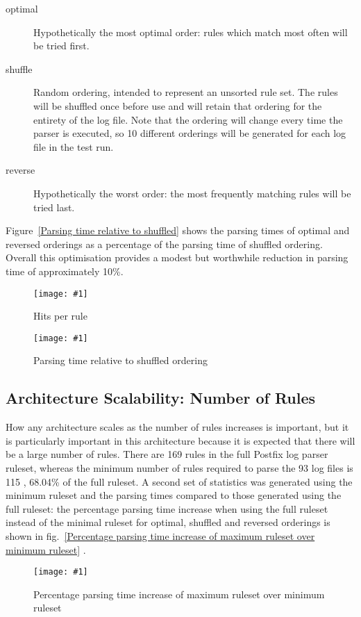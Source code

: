 \documentclass[draft]{svmult}
\newcommand{\showgraph}[3]{%
    \begin{figure}[hbtp]%
        \caption{#2}\label{#3}%
        \texttt{[image: \#1]}%
    \end{figure}%
}
\newcommand{\refwithlabel}[2]{%
    #1~\vref{#2}%
}
\newcommand{\graphref}[1]{%
    \refwithlabel{fig.}{#1}%
}
\newcommand{\Graphref}[1]{%
    \refwithlabel{Figure}{#1}%
}
\newcommand{\numberOFlogFILES}[0]{%
    93%
}
\newcommand{\numberOFrules}[0]{%
    169%
}
\newcommand{\numberOFrulesMINIMUM}[0]{%
    115%
}
\newcommand{\numberOFrulesMINIMUMpercentage}[0]{%
    68.04\%%
}
\begin{document}
\begin{description}

    \item [optimal]  Hypothetically the most optimal order: rules which
        match most often will be tried first.

    \item [shuffle] Random ordering, intended to represent an unsorted rule
        set.  The rules will be shuffled once before use and will retain
        that ordering for the entirety of the log file.  Note that the
        ordering will change every time the parser is executed, so 10
        different orderings will be generated for each log file in the test
        run.

    \item [reverse] Hypothetically the worst order: the most frequently
        matching rules will be tried last.

\end{description}

\Graphref{Parsing time relative to shuffled} shows the parsing times of
optimal and reversed orderings as a percentage of the parsing time of
shuffled ordering.  Overall this optimisation provides a modest but
worthwhile reduction in parsing time of approximately 10\%.
\showgraph{build/graph-hits}{Hits per rule}{rule hits graph}
\showgraph{build/graph-optimal-and-reverse-vs-shuffle}{Parsing time
relative to shuffled ordering}{Parsing time relative to shuffled}

\subsection{Architecture Scalability: Number of Rules}

How any architecture scales as the number of rules increases is important,
but it is particularly important in this architecture because it is
expected that there will be a large number of rules.  There are
\numberOFrules{} rules in the full Postfix log parser ruleset, whereas the
minimum number of rules required to parse the \numberOFlogFILES{} log files
is \numberOFrulesMINIMUM{}, \numberOFrulesMINIMUMpercentage{} of the full
ruleset.  A second set of statistics was generated using the minimum
ruleset and the parsing times compared to those generated using the full
ruleset: the percentage parsing time increase when using the full ruleset
instead of the minimal ruleset for optimal, shuffled and reversed orderings
is shown in \graphref{Percentage parsing time increase of maximum ruleset
over minimum ruleset}.
\showgraph{build/graph-full-ruleset-vs-minimum-ruleset}{Percentage parsing
time increase of maximum ruleset over minimum ruleset}{Percentage parsing
time increase of maximum ruleset over minimum ruleset}
\end{document}

